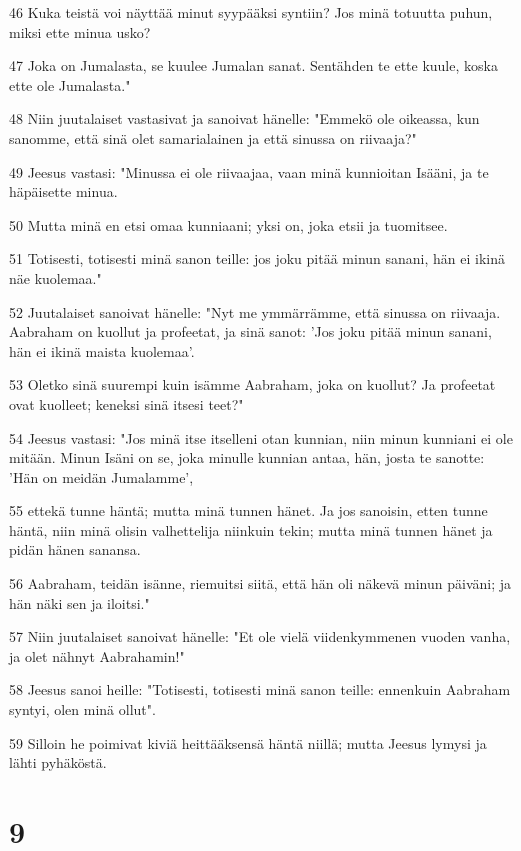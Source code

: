 \par 46 Kuka teistä voi näyttää minut syypääksi syntiin? Jos minä totuutta puhun, miksi ette minua usko?
\par 47 Joka on Jumalasta, se kuulee Jumalan sanat. Sentähden te ette kuule, koska ette ole Jumalasta."
\par 48 Niin juutalaiset vastasivat ja sanoivat hänelle: "Emmekö ole oikeassa, kun sanomme, että sinä olet samarialainen ja että sinussa on riivaaja?"
\par 49 Jeesus vastasi: "Minussa ei ole riivaajaa, vaan minä kunnioitan Isääni, ja te häpäisette minua.
\par 50 Mutta minä en etsi omaa kunniaani; yksi on, joka etsii ja tuomitsee.
\par 51 Totisesti, totisesti minä sanon teille: jos joku pitää minun sanani, hän ei ikinä näe kuolemaa."
\par 52 Juutalaiset sanoivat hänelle: "Nyt me ymmärrämme, että sinussa on riivaaja. Aabraham on kuollut ja profeetat, ja sinä sanot: 'Jos joku pitää minun sanani, hän ei ikinä maista kuolemaa'.
\par 53 Oletko sinä suurempi kuin isämme Aabraham, joka on kuollut? Ja profeetat ovat kuolleet; keneksi sinä itsesi teet?"
\par 54 Jeesus vastasi: "Jos minä itse itselleni otan kunnian, niin minun kunniani ei ole mitään. Minun Isäni on se, joka minulle kunnian antaa, hän, josta te sanotte: 'Hän on meidän Jumalamme',
\par 55 ettekä tunne häntä; mutta minä tunnen hänet. Ja jos sanoisin, etten tunne häntä, niin minä olisin valhettelija niinkuin tekin; mutta minä tunnen hänet ja pidän hänen sanansa.
\par 56 Aabraham, teidän isänne, riemuitsi siitä, että hän oli näkevä minun päiväni; ja hän näki sen ja iloitsi."
\par 57 Niin juutalaiset sanoivat hänelle: "Et ole vielä viidenkymmenen vuoden vanha, ja olet nähnyt Aabrahamin!"
\par 58 Jeesus sanoi heille: "Totisesti, totisesti minä sanon teille: ennenkuin Aabraham syntyi, olen minä ollut".
\par 59 Silloin he poimivat kiviä heittääksensä häntä niillä; mutta Jeesus lymysi ja lähti pyhäköstä.

\chapter{9}

